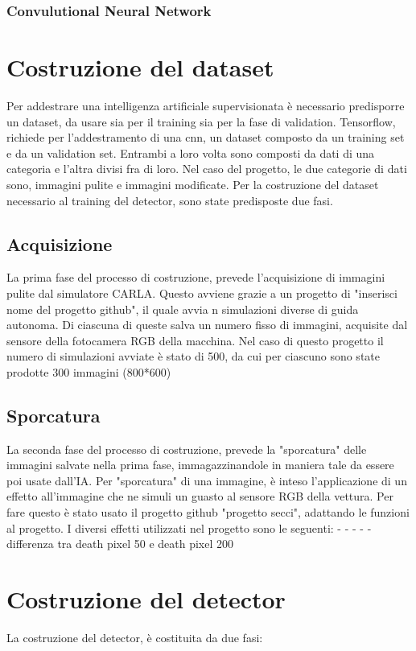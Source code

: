 \documentclass[14pt]{extarticle}
\begin{document}
\subsubsection{Convulutional Neural Network}





\section{Costruzione del dataset}
Per addestrare una intelligenza artificiale supervisionata è necessario predisporre un dataset, da usare sia per il training sia per la fase di validation.
Tensorflow, richiede per l'addestramento di una cnn, un dataset composto da un training set e da un validation set. Entrambi a loro volta sono composti da dati di una categoria e l'altra divisi fra di loro. Nel caso del progetto, le due categorie di dati sono, immagini pulite e immagini modificate.
Per la costruzione del dataset necessario al training del detector, sono state predisposte due fasi.


\subsection{Acquisizione}
La prima fase del processo di costruzione, prevede l'acquisizione di immagini pulite dal simulatore CARLA. Questo avviene grazie a un progetto di "inserisci nome del progetto github", il quale avvia n simulazioni diverse di guida autonoma. Di ciascuna di queste salva un numero fisso di immagini, acquisite dal sensore della fotocamera RGB della macchina.
Nel caso di questo progetto il numero di simulazioni avviate è stato di 500, da cui per ciascuno sono state prodotte 300 immagini (800*600)
\subsection{Sporcatura}
La seconda fase del processo di costruzione, prevede la "sporcatura" delle immagini salvate nella prima fase, immagazzinandole in maniera tale da essere poi usate dall'IA.
Per "sporcatura" di una immagine, è inteso l'applicazione di un effetto all'immagine che ne simuli un guasto al sensore RGB della vettura.
Per fare questo è stato usato il progetto github "progetto secci", adattando le funzioni al progetto.
I diversi effetti utilizzati nel progetto sono le seguenti:
-
-
-
-
-
differenza tra death pixel 50 e death pixel 200 

\section{Costruzione del detector}
La costruzione del detector, è costituita da due fasi:
\end{document}
